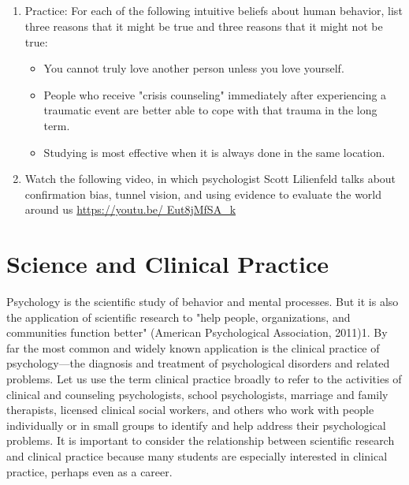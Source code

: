 \subsection{}
\begin{fullwidth}
\begin{enumerate}
\item Practice: For each of the following intuitive beliefs about human behavior, list three reasons that it might be true and three reasons that it might not be true:
\begin{itemize}
\item You cannot truly love another person unless you love yourself.
\item People who receive "crisis counseling" immediately after experiencing a traumatic event are better able to cope with that trauma in the long term.
\item Studying is most effective when it is always done in the same location.
\end{itemize}
\item Watch the following video, in which psychologist Scott Lilienfeld talks about confirmation bias, tunnel vision, and using evidence to evaluate the world around us \url{https://youtu.be/ Eut8jMfSA_k}
\end{enumerate}
\end{fullwidth}

\newpage
\section{Science and Clinical Practice}


Psychology is the scientific study of behavior and mental processes. But it is also the application of scientific research to "help people, organizations, and communities function better" (American Psychological Association, 2011)1. By far the most common and widely known application is the clinical practice of psychology---the diagnosis and treatment of psychological disorders and related problems. Let us use the term clinical practice broadly to refer to the activities of clinical and counseling psychologists, school psychologists, marriage and family therapists, licensed clinical social workers, and others who work with people individually or in small groups to identify and help address their psychological problems. It is important to consider the relationship between scientific research and clinical practice because many students are especially interested in clinical practice, perhaps even as a career.


